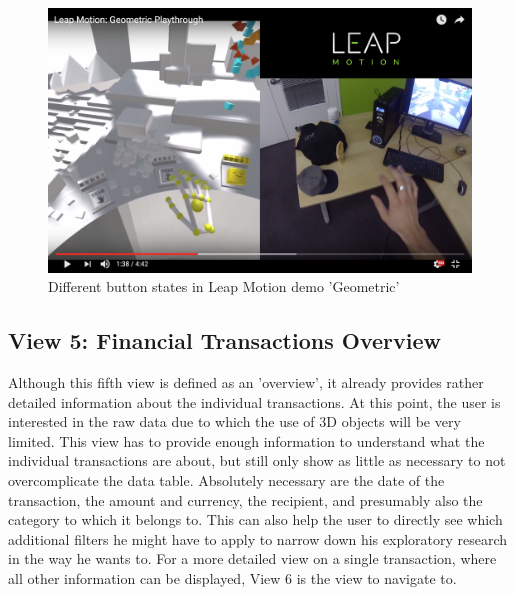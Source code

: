 \begin{figure}[t]
	\begin{center}
		\includegraphics[width=14cm]{03_Figures/07_Suggestion/LeapMotion2016_Geometric.png}
		\caption[Different button states in Leap Motion demo 'Geometric']{Different button states in Leap Motion demo 'Geometric' \citep{LeapMotion2016}}
		\label{fig:leapmotiongeometric}
	\end{center}
\end{figure}



\subsection{View 5: Financial Transactions Overview}

Although this fifth view is defined as an 'overview', it already provides rather detailed information about the individual transactions. At this point, the user is interested in the raw data due to which the use of 3D objects will be very limited. This view has to provide enough information to understand what the individual transactions are about, but still only show as little as necessary to not overcomplicate the data table. Absolutely necessary are the date of the transaction, the amount and currency, the recipient, and presumably also the category to which it belongs to. This can also help the user to directly see which additional filters he might have to apply to narrow down his exploratory research in the way he wants to. For a more detailed view on a single transaction, where all other information can be displayed, View 6 is the view to navigate to.


